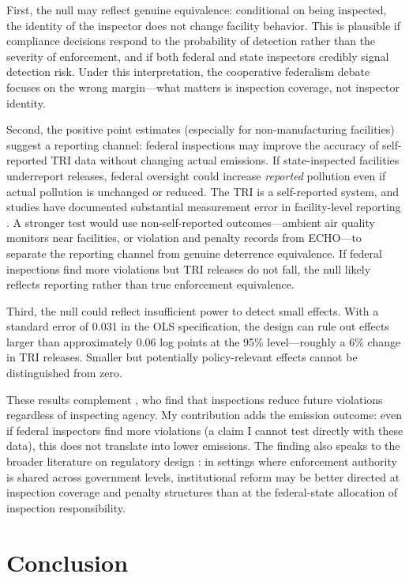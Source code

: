 \documentclass[12pt]{article}
\begin{document}
First, the null may reflect genuine equivalence: conditional on being inspected, the identity of the inspector does not change facility behavior. This is plausible if compliance decisions respond to the probability of detection rather than the severity of enforcement, and if both federal and state inspectors credibly signal detection risk. Under this interpretation, the cooperative federalism debate focuses on the wrong margin---what matters is inspection coverage, not inspector identity.

Second, the positive point estimates (especially for non-manufacturing facilities) suggest a reporting channel: federal inspections may improve the accuracy of self-reported TRI data without changing actual emissions. If state-inspected facilities underreport releases, federal oversight could increase \emph{reported} pollution even if actual pollution is unchanged or reduced. The TRI is a self-reported system, and studies have documented substantial measurement error in facility-level reporting \citep{deBruyn2006tri, koehler2007tri}. A stronger test would use non-self-reported outcomes---ambient air quality monitors near facilities, or violation and penalty records from ECHO---to separate the reporting channel from genuine deterrence equivalence. If federal inspections find more violations but TRI releases do not fall, the null likely reflects reporting rather than true enforcement equivalence.

Third, the null could reflect insufficient power to detect small effects. With a standard error of 0.031 in the OLS specification, the design can rule out effects larger than approximately 0.06 log points at the 95\% level---roughly a 6\% change in TRI releases. Smaller but potentially policy-relevant effects cannot be distinguished from zero.

These results complement \citet{gray2005compliance}, who find that inspections reduce future violations regardless of inspecting agency. My contribution adds the emission outcome: even if federal inspectors find more violations (a claim I cannot test directly with these data), this does not translate into lower emissions. The finding also speaks to the broader literature on regulatory design \citep{duflo2018value}: in settings where enforcement authority is shared across government levels, institutional reform may be better directed at inspection coverage and penalty structures than at the federal-state allocation of inspection responsibility.

\section{Conclusion}
\end{document}
